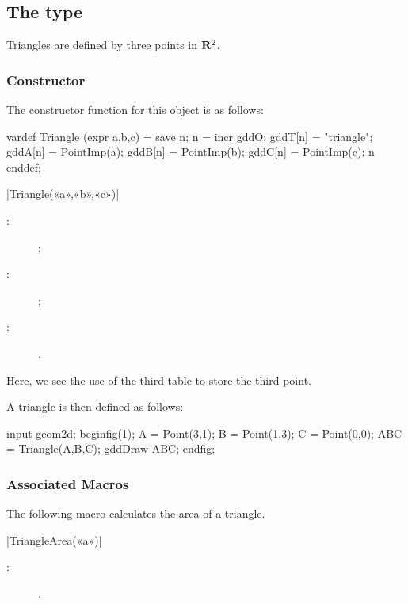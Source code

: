 \documentclass[a4paper,english]{article}
\begin{document}
\subsection{The  type}

Triangles are defined by three points in $\mathbf{R}^2$.

\subsubsection{Constructor}
The constructor function for this object is as follows:
\begin{mpcode}
vardef Triangle (expr a,b,c) =
  save n; n = incr gddO; gddT[n] = "triangle";
  gddA[n] = PointImp(a); gddB[n] = PointImp(b); gddC[n] = PointImp(c); n
enddef;
\end{mpcode}

\begin{colourband}
\macro|Triangle(«a»,«b»,«c»)|
\begin{description}
  \item[:]   ;
  \item[:]   ;
  \item[:]  .
\end{description}
\end{colourband}


\bigskip

Here, we see the use of the third table  to store the third point.

A triangle is then defined as follows:
\begin{ExempleMP}
input geom2d;
beginfig(1);
A = Point(3,1);
B = Point(1,3);
C = Point(0,0);
ABC = Triangle(A,B,C);
gddDraw ABC;
endfig;
\end{ExempleMP}

\subsubsection{Associated Macros}

The following macro calculates the area of a triangle.
\begin{colourband}
\macro|TriangleArea(«a»)|
\begin{description}
  \item[:]  .
\end{description}
\end{colourband}
\end{document}
